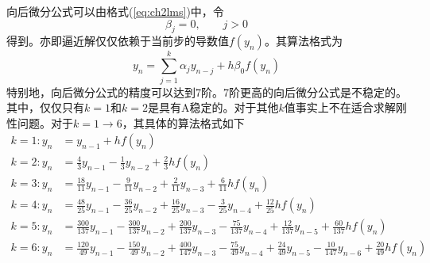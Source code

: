 向后微分公式可以由格式(\ref{eq:ch2lms})中，令
\begin{equation}
\beta_j=0,\qquad j>0
\end{equation}
得到。亦即逼近解仅仅依赖于当前步的导数值$f(y_n)$。其算法格式为
\begin{equation}
y_n=\sum_{j=1}^{k}\alpha_jy_{n-j}+h\beta_0f(y_n)\label{eq:ch2BDF}
\end{equation}
特别地，向后微分公式的精度可以达到7阶。7阶更高的向后微分公式是不稳定的\cite{Gear1971c}。其中，仅仅只有$k=1$和$k=2$是具有A稳定的。对于其他$k$值事实上不在适合求解刚性问题。对于$k=1\to 6$，其具体的算法格式如下
\begin{align}
k=1:y_n&=y_{n-1}+hf(y_n)\\
k=2:y_n&=\frac{4}{3}y_{n-1}-\frac13y_{n-2}+\frac23hf(y_n)\\
k=3:y_n&=\frac{18}{11}y_{n-1}-\frac{9}{11}y_{n-2}+\frac{2}{11}y_{n-3}+\frac{6}{11}hf(y_{n})\\
k=4:y_n&=\frac{48}{25}y_{n-1}-\frac{36}{25}y_{n-2}+\frac{16}{25}y_{n-3}-\frac{3}{25}y_{n-4}+\frac{12}{25}hf(y_n)\\
k=5:y_n&=\frac{300}{137}y_{n-1}-\frac{300}{137}y_{n-2}+\frac{200}{137}y_{n-3}-\frac{75}{137}y_{n-4}+\frac{12}{137}y_{n-5}+\frac{60}{137}hf(y_n)\\
k=6:y_n&=\frac{120}{49}y_{n-1}-\frac{150}{49}y_{n-2}+\frac{400}{147}y_{n-3}-\frac{75}{49}y_{n-4}+\frac{24}{49}y_{n-5}-\frac{10}{147}y_{n-6}+\frac{20}{49}hf(y_n)
\end{align}

